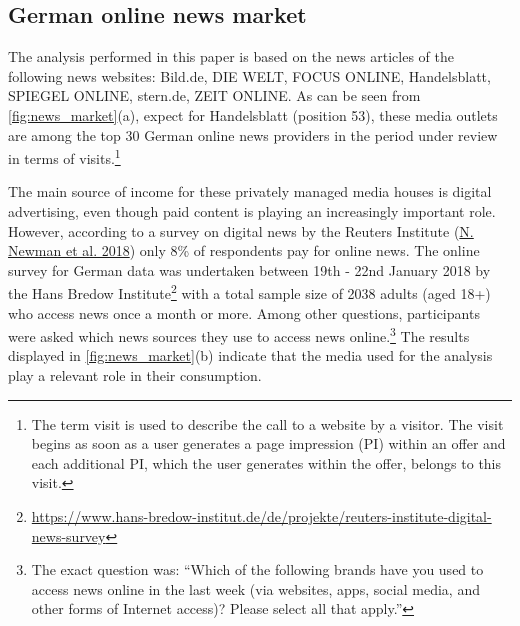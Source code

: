 \documentclass[
]{article}
\begin{document}
\hypertarget{german-online-news-market}{%
\subsection{German online news market}\label{german-online-news-market}}

The analysis performed in this paper is based on the news articles of
the following news websites: Bild.de, DIE WELT, FOCUS ONLINE,
Handelsblatt, SPIEGEL ONLINE, stern.de, ZEIT ONLINE. As can be seen from
\autoref{fig:news_market}(a), expect for Handelsblatt (position 53),
these media outlets are among the top 30 German online news providers in
the period under review in terms of visits.\footnote{The term visit is
  used to describe the call to a website by a visitor. The visit begins
  as soon as a user generates a page impression (PI) within an offer and
  each additional PI, which the user generates within the offer, belongs
  to this visit.}

The main source of income for these privately managed media houses is
digital advertising, even though paid content is playing an increasingly
important role. However, according to a survey on digital news by the
Reuters Institute (\protect\hyperlink{ref-newman_reuters_2018}{N. Newman
et al. 2018}) only 8\% of respondents pay for online news. The online
survey for German data was undertaken between 19th - 22nd January 2018
by the Hans Bredow Institute\footnote{\url{https://www.hans-bredow-institut.de/de/projekte/reuters-institute-digital-news-survey}}
with a total sample size of 2038 adults (aged 18+) who access news once
a month or more. Among other questions, participants were asked which
news sources they use to access news online.\footnote{The exact question
  was: ``Which of the following brands have you used to access news
  online in the last week (via websites, apps, social media, and other
  forms of Internet access)? Please select all that apply.''} The
results displayed in \autoref{fig:news_market}(b) indicate that the
media used for the analysis play a relevant role in their consumption.
\end{document}
